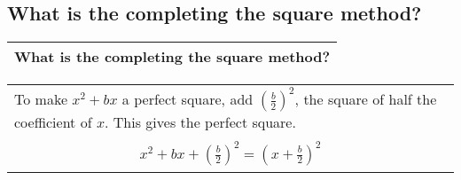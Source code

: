 \subsection{What is the completing the square method?}
\begin{small}
    \begin{tabularx}{1\textwidth}{
            p{}
        }
        \toprule
            What is the completing the square method?
        \\
        \bottomrule
    \end{tabularx}
\end{small}
\begin{small}
    \begin{tabularx}{1\textwidth}{
            p{}
        }
        \toprule
            To make $x^2 + bx$ a perfect square, add $ \left(\frac{b}{2}\right)^2 $, 
            the square of half the coefficient of $x$. This gives the perfect square.\\
            \[
                \begin{aligned}
                    x^2 + bx + \left(\frac{b}{2}\right)^2 = \left(x + \frac{b}{2}\right)^2
                \end{aligned}
            \]
        \\
        \bottomrule
    \end{tabularx}
\end{small}
